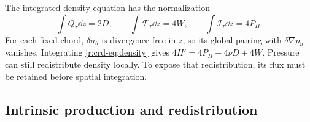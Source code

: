 The integrated density equation has the normalization
\begin{equation}
 \int Q_\tau\dd z=2D,\qquad
 \int\mathcal F_\tau\dd z=4W,\qquad
 \int\mathcal I_\tau\dd z=4P_H.
 \label{r:crd-eq:integrated-density}
\end{equation}
For each fixed chord, \(\delta u_\theta\) is divergence free in \(z\),
so its global pairing with \(\delta\nabla p_u\) vanishes.
Integrating \eqref{r:crd-eq:density} gives
\(4H'=4P_H-4\nu D+4W\).
Pressure can still redistribute density locally. To expose that
redistribution, its flux must be retained before spatial integration.

\subsection{Intrinsic production and redistribution}

